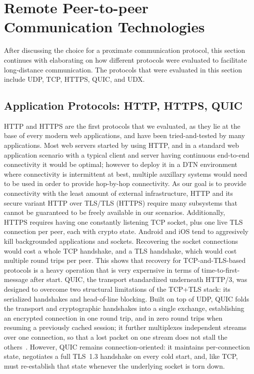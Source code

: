 \section{Remote Peer-to-peer Communication Technologies}
\label{sec:remote-p2p-protocols}
After discussing the choice for a proximate communication protocol, this section continues with elaborating on how different protocols were evaluated to facilitate long-distance communication.
The protocols that were evaluated in this section include UDP, TCP, HTTPS, QUIC, and UDX.

\subsection{Application Protocols: HTTP, HTTPS, QUIC}
HTTP and HTTPS are the first protocols that we evaluated, as they lie at the base of every modern web applications, and have been tried-and-tested by many applications.
Most web servers started by using HTTP, and in a standard web application scenario with a typical client and server having continuous end-to-end connectivity it would be optimal; however to deploy it in a DTN environment where connectivity is intermittent at best, multiple auxillary systems would need to be used in order to provide hop-by-hop connectivity. As our goal is to provide connectivity with the least amount of external infrastructure, HTTP and its secure variant HTTP over TLS/TLS (HTTPS) require many subsystems that cannot be guaranteed to be freely available in our scenarios.
Additionally, HTTPS requires having one constantly listening TCP socket, plus one live TLS connection per peer, each with crypto state. Android and iOS tend to aggresively kill backgrounded applications and sockets. Recovering the socket connections would cost a whole TCP handshake, and a TLS handshake, which would cost multiple round trips per peer.
This shows that recovery for TCP-and-TLS-based protocols is a heavy operation that is very expernsive in terms of time-to-first-message after start.
QUIC, the transport standardized underneath HTTP/3, was designed to overcome two structural limitations of the TCP+TLS stack: its serialized handshakes and head-of-line blocking.
Built on top of UDP, QUIC folds the transport and cryptographic handshakes into a single exchange, establishing an encrypted connection in one round trip, and in zero round trips when resuming a previously cached session; it further multiplexes independent streams over one connection, so that a lost packet on one stream does not stall the others~\cite{Langley2017}.
However, QUIC remains connection-oriented: it maintains per-connection state, negotiates a full TLS~1.3 handshake on every cold start, and, like TCP, must re-establish that state whenever the underlying socket is torn down.
